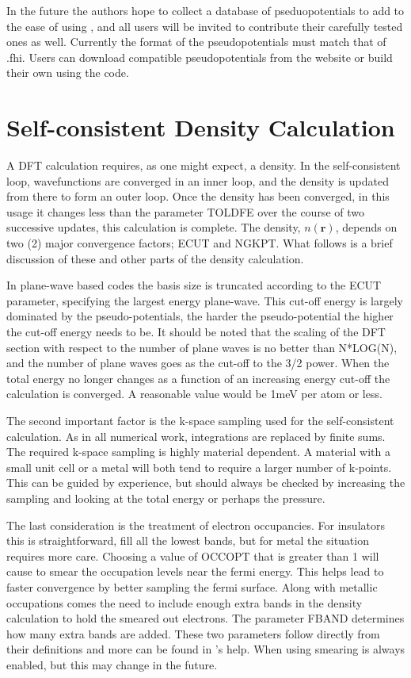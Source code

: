 \documentclass[11pt]{report}
\begin{document}
In the future the authors hope to collect a database of pseduopotentials to add to the ease of using ,
 and all users will be invited to contribute their carefully tested ones as well. Currently the format of the pseudopotentials must
 match that of  .fhi. Users can download compatible pseudopotentials from the  website \cite{abinit0} or build their own using the  code. 

\section{Self-consistent Density Calculation}
A DFT calculation requires, as one might expect, a density. In the self-consistent loop, wavefunctions are converged in an inner loop, and the density is updated from there to form an outer loop. Once the density has been converged, in this usage it changes less than the parameter TOLDFE over the course of two successive updates, this calculation is complete. The density, $n(\mathbf{r})$, depends on two (2) major convergence factors; ECUT and NGKPT. What follows is a brief discussion of these and other parts of the density calculation.

In plane-wave based codes the basis size is truncated according to the ECUT parameter, specifying the largest energy plane-wave. This cut-off energy is largely dominated by the pseudo-potentials, the harder the pseudo-potential the higher the cut-off energy needs to be. It should be noted that the scaling of the DFT section with respect to the number of plane waves is no better than N*LOG(N), and the number of plane waves goes as the cut-off to the 3/2 power. When the total energy no longer changes as a function of an increasing energy cut-off the calculation is converged. A reasonable value would be 1meV per atom or less.

The second important factor is the k-space sampling used for the self-consistent calculation. As in all numerical work, integrations are replaced by finite sums. The required k-space sampling is highly material dependent. A material with a small unit cell or a metal will both tend to require a larger number of k-points. This can be guided by experience, but should always be checked by increasing the sampling and looking at the total energy or perhaps the pressure. 

The last consideration is the treatment of electron occupancies. For insulators this is straightforward, fill all the lowest bands, but for metal the situation requires more care. Choosing a value of OCCOPT that is greater than 1 will cause  to smear the occupation levels near the fermi energy. This helps lead to faster convergence by better sampling the fermi surface. Along with metallic occupations comes the need to include enough extra bands in the density calculation to hold the smeared out electrons. The parameter FBAND determines how many extra bands are added. These two parameters follow directly from their  definitions and more can be found in 's help. When using  smearing is always enabled, but this may change in the future. 
\end{document}
